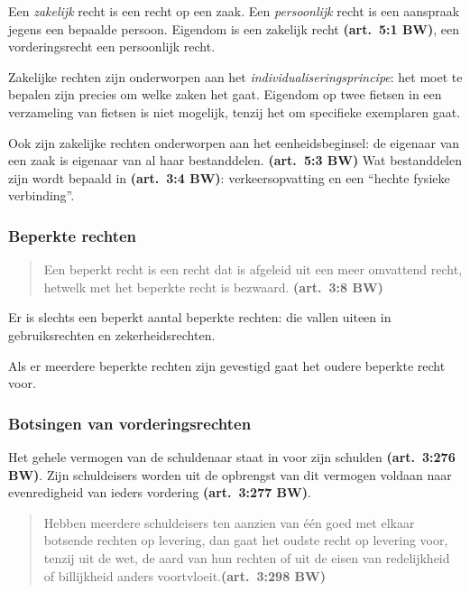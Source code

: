 \documentclass[a4paper]{article}
\newcommand{\art}[1]{\textbf{(art.~#1 BW)}\xspace}
\begin{document}
Een \emph{zakelijk} recht is een recht op een zaak. Een \emph{persoonlijk}
recht is een aanspraak jegens een bepaalde persoon. Eigendom is een zakelijk
recht \art{5:1}, een vorderingsrecht een persoonlijk recht.

Zakelijke rechten zijn onderworpen aan het \emph{individualiseringsprincipe}:
het moet te bepalen zijn precies om welke zaken het gaat. Eigendom op twee
fietsen in een verzameling van fietsen is niet mogelijk, tenzij het om
specifieke exemplaren gaat.

Ook zijn zakelijke rechten onderworpen aan het eenheidsbeginsel: de eigenaar
van een zaak is eigenaar van al haar bestanddelen. \art{5:3} Wat bestanddelen
zijn wordt bepaald in \art{3:4}: verkeersopvatting en een ``hechte fysieke
verbinding''.

\subsubsection{Beperkte rechten}

\begin{quote}
  
  Een beperkt recht is een recht dat is afgeleid uit een meer omvattend recht,
  hetwelk met het beperkte recht is bezwaard. \art{3:8}
  
\end{quote}

Er is slechts een beperkt aantal beperkte rechten: die vallen uiteen in
gebruiksrechten en zekerheidsrechten.

Als er meerdere beperkte rechten zijn gevestigd gaat het oudere beperkte recht
voor.

\subsubsection{Botsingen van vorderingsrechten}

Het gehele vermogen van de schuldenaar staat in voor zijn schulden
\art{3:276}. Zijn schuldeisers worden uit de opbrengst van dit vermogen
voldaan naar evenredigheid van ieders vordering \art{3:277}.

\begin{quote}

  Hebben meerdere schuldeisers ten aanzien van \'e\'en goed met elkaar
  botsende rechten op levering, dan gaat het oudste recht op levering voor,
  tenzij uit de wet, de aard van hun rechten of uit de eisen van redelijkheid
  of billijkheid anders voortvloeit.\art{3:298}

\end{quote}
\end{document}
